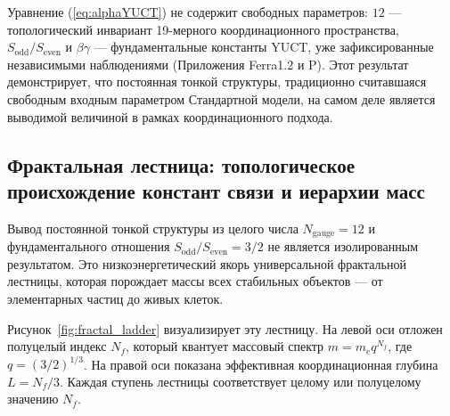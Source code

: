 \documentclass[12pt,a4paper]{article}
\begin{document}
	Уравнение (\ref{eq:alphaYUCT}) не содержит свободных параметров: \(12\) — топологический инвариант 19-мерного координационного пространства, \(S_{\mathrm{odd}}/S_{\mathrm{even}}\) и \(\beta\gamma\) — фундаментальные константы YUCT, уже зафиксированные независимыми наблюдениями (Приложения Ferra1.2 и P).  
	Этот результат демонстрирует, что постоянная тонкой структуры, традиционно считавшаяся свободным входным параметром Стандартной модели, на самом деле является выводимой величиной в рамках координационного подхода.
	
	\subsection{Фрактальная лестница: топологическое происхождение констант связи и иерархии масс}
	\label{sec:fractal_ladder}
	
	Вывод постоянной тонкой структуры из целого числа \(N_{\mathrm{gauge}}=12\) и фундаментального отношения \(S_{\mathrm{odd}}/S_{\mathrm{even}}=3/2\) не является изолированным результатом. Это низкоэнергетический якорь универсальной фрактальной лестницы, которая порождает массы всех стабильных объектов — от элементарных частиц до живых клеток.
	
	Рисунок~\ref{fig:fractal_ladder} визуализирует эту лестницу. На левой оси отложен полуцелый индекс \(N_f\), который квантует массовый спектр \(m = m_e q^{N_f}\), где \(q = (3/2)^{1/3}\). На правой оси показана эффективная координационная глубина \(L = N_f/3\). Каждая ступень лестницы соответствует целому или полуцелому значению \(N_f\).
	
\end{document}
